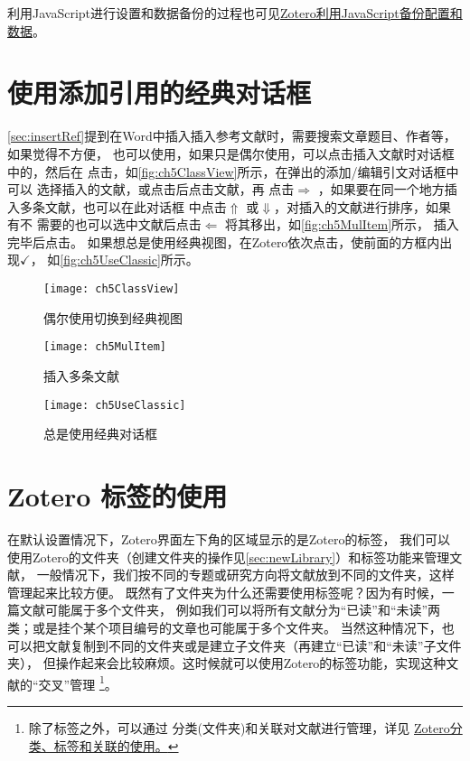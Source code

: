 \documentclass[cn,11pt,chinese]{elegantbook}
\begin{document}
					利用JavaScript进行设置和数据备份的过程也可见\href{https://zhuanlan.zhihu.com/p/357859432}
					{Zotero利用JavaScript备份配置和数据}。




	\section{使用添加引用的经典对话框} \label{sec:classView}				
		\cref{sec:insertRef}提到在Word中插入插入参考文献时，需要搜索文章题目、作者等，如果觉得不方便，
		也可以使用，如果只是偶尔使用，可以点击插入文献时对话框中的，然后在
		点击，如\autoref{fig:ch5ClassView}所示，在弹出的添加/编辑引文对话框中可以
		选择插入的文献，或点击后点击文献，再
		点击$\Rightarrow$ ，如果要在同一个地方插入多条文献，也可以在此对话框
		中点击$\Uparrow$ 或$\Downarrow$，对插入的文献进行排序，如果有不
		需要的也可以选中文献后点击$\Leftarrow$ 将其移出，如\autoref{fig:ch5MulItem}所示，
		插入完毕后点击。
		如果想总是使用经典视图，在Zotero依次点击，使前面的方框内出现$\checkmark$，
		如\autoref{fig:ch5UseClassic}所示。
			\begin{figure}[htbp]
				\centering
				\texttt{[image: ch5ClassView]}
				\caption{偶尔使用切换到经典视图}
				\label{fig:ch5ClassView}
			\end{figure}
			\begin{figure}[htbp]
				\centering
				\texttt{[image: ch5MulItem]}
				\caption{插入多条文献}
				\label{fig:ch5MulItem}
			\end{figure}
			\begin{figure}[htbp]
				\centering
				\texttt{[image: ch5UseClassic]}
				\caption{总是使用经典对话框}
				\label{fig:ch5UseClassic}
			\end{figure}

	\section{Zotero 标签的使用} \label{sec:tag}
			在默认设置情况下，Zotero界面左下角的区域显示的是Zotero的标签，
			我们可以使用Zotero的文件夹（创建文件夹的操作见\cref{sec:newLibrary}）和标签功能来管理文献，
			一般情况下，我们按不同的专题或研究方向将文献放到不同的文件夹，这样管理起来比较方便。
			既然有了文件夹为什么还需要使用标签呢？因为有时候，一篇文献可能属于多个文件夹，
			例如我们可以将所有文献分为“已读”和“未读”两类；或是挂个某个项目编号的文章也可能属于多个文件夹。
			当然这种情况下，也可以把文献复制到不同的文件夹或是建立子文件夹（再建立“已读”和“未读”子文件夹），
			但操作起来会比较麻烦。这时候就可以使用Zotero的标签功能，实现这种文献的“交叉”管理
			\footnote{除了标签之外，可以通过
		分类(文件夹)和关联对文献进行管理，详见
		\href{https://zhuanlan.zhihu.com/p/275707703}{Zotero分类、标签和关联的使用。}}。
			
\end{document}
